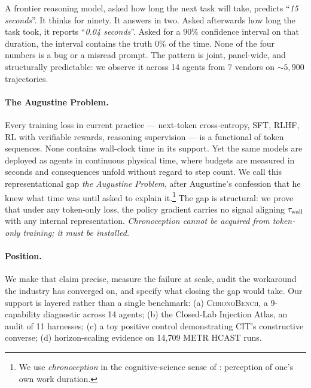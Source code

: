 \documentclass{article}
\begin{document}
A frontier reasoning model, asked how long the next task will take, predicts ``\textit{15 seconds}''. It thinks for ninety. It answers in two. Asked afterwards how long the task took, it reports ``\textit{0.04 seconds}''. Asked for a $90\%$ confidence interval on that duration, the interval contains the truth $0\%$ of the time. None of the four numbers is a bug or a misread prompt. The pattern is joint, panel-wide, and structurally predictable: we observe it across 14 agents from 7 vendors on ${\sim}5{,}900$ trajectories.

\paragraph{The Augustine Problem.} Every training loss in current practice --- next-token cross-entropy, SFT, RLHF, RL with verifiable rewards, reasoning supervision --- is a functional of token sequences. None contains wall-clock time in its support. Yet the same models are deployed as agents in continuous physical time, where budgets are measured in seconds and consequences unfold without regard to step count. We call this representational gap \emph{the Augustine Problem}, after Augustine's confession that he knew what time was until asked to explain it.\footnote{We use \emph{chronoception} in the cognitive-science sense of \citet{wittmann2009chronoception}: perception of one's own work duration.} The gap is structural: we prove that under any token-only loss, the policy gradient carries no signal aligning $\tau_{\mathrm{wall}}$ with any internal representation. \emph{Chronoception cannot be acquired from token-only training; it must be installed.}

\paragraph{Position.} We make that claim precise, measure the failure at scale, audit the workaround the industry has converged on, and specify what closing the gap would take. Our support is layered rather than a single benchmark: (a) \textsc{ChronoBench}, a 9-capability diagnostic across 14 agents; (b) the Closed-Lab Injection Atlas, an audit of 11 harnesses; (c) a toy positive control demonstrating CIT's constructive converse; (d) horizon-scaling evidence on 14{,}709 METR HCAST runs.
\end{document}
